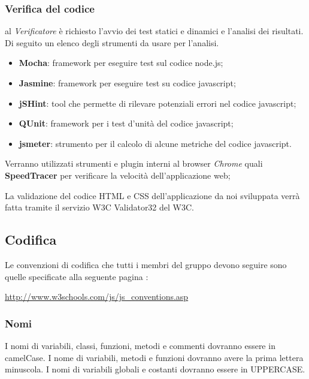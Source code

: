 	\subsubsection{Verifica del codice}
	al \emph{Verificatore} è richiesto l’avvio dei test statici e dinamici e l’analisi dei risultati. Di seguito un elenco degli strumenti da usare per l’analisi.
	
	
	  \begin{itemize}
	  \item \textbf{Mocha}: framework per eseguire test sul codice node.js;
	  \item \textbf{Jasmine}: framework per eseguire test su codice javascript;
	  \item \textbf{jSHint}: tool che permette di rilevare potenziali errori nel codice javascript;
	  \item \textbf{QUnit}: framework per i test d'unità del codice javascript;
	  \item \textbf{jsmeter}: strumento per il calcolo di alcune metriche del codice javascript.
	  \end{itemize}
	
	Verranno utilizzati strumenti e plugin interni al browser \emph{Chrome} quali \textbf{SpeedTracer} per verificare la velocità dell'applicazione web;
	
	
	
	La validazione del codice HTML e CSS dell’applicazione da noi sviluppata verrà
	fatta tramite il servizio W3C Validator32 del W3C.
	
	\subsection{Codifica}
	Le convenzioni di codifica che tutti i membri del gruppo devono seguire sono quelle
	specificate alla seguente pagina :\\
	\begin{center} \url{http://www.w3schools.com/js/js_conventions.asp} \end{center}
	\subsubsection{Nomi}
	I nomi di variabili, classi, funzioni, metodi e commenti dovranno essere in camelCase. I nome di variabili, metodi e funzioni dovranno avere la prima lettera	minuscola.
	I nomi di variabili globali e costanti dovranno essere in UPPERCASE.
